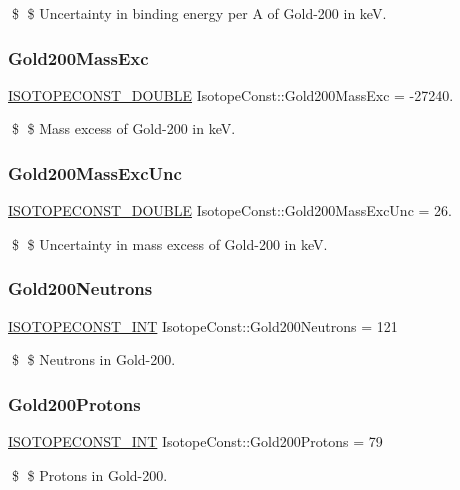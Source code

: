 \$ \$ Uncertainty in binding energy per A of Gold-\/200 in keV. \mbox{\label{group___isotope_const-_gold-_au200_ga2ac535f059a623abb0d106f410b8504d}} 
\subsubsection{\texorpdfstring{Gold200\+Mass\+Exc}{Gold200MassExc}}
{\footnotesize\ttfamily \mbox{\hyperlink{group___isotope_const-_macros_ga8f45a7272ce02c0b4c65c44636ed719a}{I\+S\+O\+T\+O\+P\+E\+C\+O\+N\+S\+T\+\_\+\+D\+O\+U\+B\+LE}} Isotope\+Const\+::\+Gold200\+Mass\+Exc = -\/27240.}

\$ \$ Mass excess of Gold-\/200 in keV. \mbox{\label{group___isotope_const-_gold-_au200_ga7cebd77a438abde3d6ac5a65a2f662ab}} 
\subsubsection{\texorpdfstring{Gold200\+Mass\+Exc\+Unc}{Gold200MassExcUnc}}
{\footnotesize\ttfamily \mbox{\hyperlink{group___isotope_const-_macros_ga8f45a7272ce02c0b4c65c44636ed719a}{I\+S\+O\+T\+O\+P\+E\+C\+O\+N\+S\+T\+\_\+\+D\+O\+U\+B\+LE}} Isotope\+Const\+::\+Gold200\+Mass\+Exc\+Unc = 26.}

\$ \$ Uncertainty in mass excess of Gold-\/200 in keV. \mbox{\label{group___isotope_const-_gold-_au200_gada5484c7867bce52716044fd46aef24e}} 
\subsubsection{\texorpdfstring{Gold200\+Neutrons}{Gold200Neutrons}}
{\footnotesize\ttfamily \mbox{\hyperlink{group___isotope_const-_macros_ga5f18360b3e99483a35c32d789e62621c}{I\+S\+O\+T\+O\+P\+E\+C\+O\+N\+S\+T\+\_\+\+I\+NT}} Isotope\+Const\+::\+Gold200\+Neutrons = 121}

\$ \$ Neutrons in Gold-\/200. \mbox{\label{group___isotope_const-_gold-_au200_gac75fe60394af9085c8bb431e32994f24}} 
\subsubsection{\texorpdfstring{Gold200\+Protons}{Gold200Protons}}
{\footnotesize\ttfamily \mbox{\hyperlink{group___isotope_const-_macros_ga5f18360b3e99483a35c32d789e62621c}{I\+S\+O\+T\+O\+P\+E\+C\+O\+N\+S\+T\+\_\+\+I\+NT}} Isotope\+Const\+::\+Gold200\+Protons = 79}

\$ \$ Protons in Gold-\/200. 
